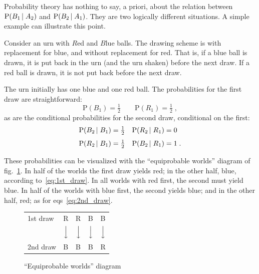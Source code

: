 \documentclass[\ifafour a4paper,12pt,\else a5paper,10pt,\fi%
onecolumn,oneside,article,%
british%
]{memoir}
\theoremstyle{remark}
\theoremstyle{innote}
\newcommand*{\p}{\mathrm{P}}%
\renewcommand*{\|}[1][]{\nonscript\,#1\vert\nonscript\;\mathopen{}}
\newcommand*{\eqns}{eqs}%
\newcommand*{\fig}{fig.}%
\begin{document}
Probability theory has nothing to say, a priori, about the relation between
$\p(B_{1} \| A_{2})$ and $\p(B_{2} \| A_{1})$. They are two logically
different situations. A simple example can illustrate this point.

Consider an urn with $R$ed and $B$lue balls. The drawing scheme is with
replacement for blue, and without replacement for red. That is, if a blue
ball is drawn, it is put back in the urn (and the urn shaken) before the
next draw. If a red ball is drawn, it is not put back before the next draw.

The urn initially has one blue and one red ball. The probabilities for the
first draw are straightforward:
\begin{equation}
  \label{eq:1st_draw}
  \p(B_{1}) = \tfrac{1}{2} \qquad \p(R_{1}) = \tfrac{1}{2} \;,
\end{equation}
as are the conditional probabilities for the second draw, conditional on
the first:
\begin{subequations}
  \label{eq:2nd_draw}
  \begin{align}
    \p(B_{2} \|B_{1}) &= \tfrac{1}{2}
    & \p(R_{2} \| R_{1}) &= 0
      \label{eq:2nd_draw_equal}
    \\[\jot]
    \p(R_{2} \|B_{1}) &= \tfrac{1}{2}
    & \p(B_{2} \| R_{1}) &= 1 \;.
      \label{eq:2nd_draw_mixed}
  \end{align}
\end{subequations}

These probabilities can be visualized with the \enquote{equiprobable
  worlds} diagram of \fig~\ref{fig:worlds}. In half of the worlds the first
draw yields red; in the other half, blue, according to~\eqref{eq:1st_draw}.
In all worlds with red first, the second must yield blue. In half of the
worlds with blue first, the second yields blue; and in the other half, red;
as for \eqns~\eqref{eq:2nd_draw}.
\begin{figure}[t]
  \begin{framed}
    \centering
    \caption{\enquote{Equiprobable worlds} diagram}\label{fig:worlds}
    \begin{tabular}{p{5em} p{1em} p{1em} p{1em} p{1em} }
      {{\footnotesize 1st draw}}& R& R & B & B
      \\[1ex]
        & $\Big\downarrow$& $\Big\downarrow$
                                   & $\Big\downarrow$& $\Big\downarrow$
      \\[2ex]
      {{\footnotesize 2nd draw}}& B& B & B & R
    \end{tabular}
  \end{framed}
\end{figure}
\end{document}

